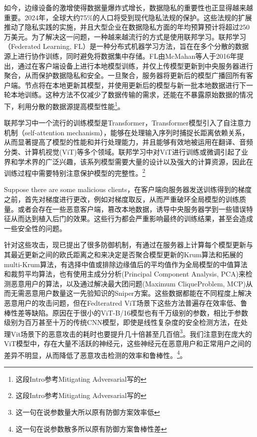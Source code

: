\documentclass[conference]{IEEEtran}
\begin{document}

如今，边缘设备的激增使得数据量爆炸式增长\cite{edgeComputing_explosiveGrowth}，数据隐私的重要性也正显得越来越重要。2024年，全球大约75\%的人口将受到现代隐私法规的保护。这些法规的扩展推动了隐私实践的实施，并且大型企业在数据隐私方面的年均预算预计将超过250万美元\cite{dataPrivacyIsEncreasing}。为了解决这一问题，一种越来越流行的方式是使用联邦学习\cite{useFL2solve}。联邦学习（Federated Learning, FL）是一种分布式机器学习方法，旨在在多个分散的数据源上进行协作训练，同时避免将数据集中存储。FL由McMahan等人于2016年提出，通过在客户端设备上进行本地模型训练，并仅上传模型更新到中央服务器进行聚合，从而保护数据隐私和安全。一旦聚合，服务器将更新后的模型广播回所有客户端。节点将在本地更新其模型，并使用更新后的模型与新一批本地数据进行下一轮本地训练。这种方法不仅减少了数据传输的需求，还能在不暴露原始数据的情况下，利用分散的数据源提高模型性能\cite{FLGenesisArticle}\footnote{这段Intro参考Mitigating Adversarial写的}。

联邦学习中一个流行的训练模型是Transformer\cite{transformer}，Transformer模型引入了自注意力机制（self-attention mechanism），能够在处理输入序列时捕捉长距离依赖关系，从而显著提高了模型的性能和并行处理能力，并且能够有效地被运用在翻译\cite{transformer_translation}、音频分类\cite{transformer_audioClassification}、计算机视觉(ViT)\cite{transformer_vision}等多个领域。联邦学习中对ViT进行训练或微调引起了业界和学术界的广泛兴趣\cite{transformer_gotInterest}，该系列模型需要大量的设计以及强大的计算资源，因此在训练过程中需要特别注意保护模型的完整性。\footnote{这段Intro参考Mitigating Adversarial写的}

Suppose there are some malicious clients，在客户端向服务器发送训练得到的梯度之前，首先对梯度进行更改，例如对梯度取反，从而严重破环全局模型的训练质量。或者会存在一些恶意客户端，篡改本地数据，诱导中央服务器学到一些错误特征从而达到植入后门的效果。这些行为都会严重影响最终的训练结果，甚至会造成一些安全性的问题。

针对这些攻击，现已提出了很多防御机制，有通过在服务器上计算每个模型更新与其最近更新之间的欧氏距离之和来决定是否聚合模型更新的Krum算法和拓展的multi-Krum算法\cite{aggregation_Krum}，有选择中值或排除边缘值后的平均值作为全局模型的中值算法和裁剪平均算法\cite{aggregation_MedianTrimmedMean}，也有使用主成分分析(Principal Component Analysis, PCA)来检测恶意用户的算法\cite{federatedPCA}，以及通过解决最大团问题(Maximum CliqueProblem, MCP)从而无需恶意用户数量这一先验知识的Sniper方案\cite{aggregation_Sniper}。这些数据都能在不同程度上解决恶意用户的攻击问题，但在Fedteratred ViT场景下这些方法普遍存在效率低、鲁棒性差等缺陷。原因在于很小的ViT-B/16模型也有千万级别的参数，相比于参数级别为百万甚至十万的传统CNN模型，即使是线性复杂度的安全检测方法，在处理Vit场景下的恶意攻击的耗时也要提升几十倍甚至几百倍\footnote{这一句在说参数量大所以原有防御方案效率低}。我们注意到在庞大的ViT模型中，存在大量不活跃的神经元，这些神经元在恶意用户和正常用户之间的差异不明显，从而降低了恶意攻击检测的效率和鲁棒性。\footnote{这一句在说参数散多所以原有防御方案鲁棒性差}。
\end{document}
